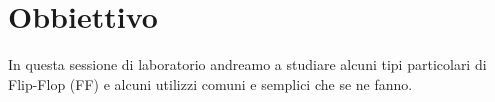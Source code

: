 \section*{Obbiettivo}

In questa sessione di laboratorio andreamo a studiare alcuni tipi particolari di Flip-Flop (FF) e alcuni utilizzi comuni e semplici che se ne fanno.